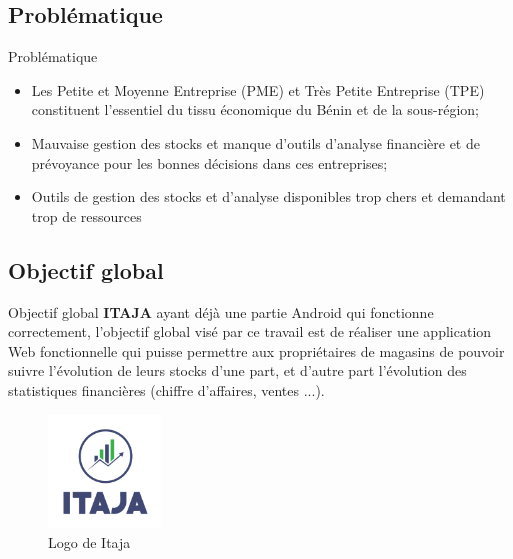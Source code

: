 \documentclass[xcolor=dvipsnames]{beamer}
\begin{document}
    \subsection{Problématique}
      \begin{frame}{Problématique}
	\begin{itemize}
	  \item Les Petite et Moyenne Entreprise (PME) et Très Petite Entreprise (TPE) constituent l’essentiel du tissu économique du Bénin et de la sous-région;
	  \pause
	  \item Mauvaise gestion des stocks et manque d'outils d'analyse financière et de prévoyance pour les bonnes décisions dans ces entreprises;
	  \pause
	  \item Outils de gestion des stocks et d'analyse disponibles trop chers et demandant trop de ressources
	\end{itemize}
      \end{frame}
    
    \subsection{Objectif global}
      \begin{frame}{Objectif global}
      \textbf{ITAJA} ayant déjà une partie Android qui fonctionne correctement, l’objectif global visé par ce travail est de réaliser une application Web fonctionnelle qui puisse permettre aux propriétaires de magasins de pouvoir suivre l’évolution de leurs stocks d’une part, et d’autre part l’évolution des statistiques financières (chiffre d’affaires, ventes ...).
      \begin{figure}[H]
	\begin{center}
	  \includegraphics[scale=0.4, width=3cm]{images/logoITAJA.png}
	  \caption{Logo de Itaja}
	\end{center}
      \end{figure}
  \end{frame}
    
\end{document}
